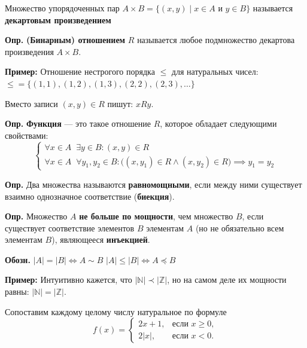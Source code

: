 \documentclass[10pt, a4paper]{article}
\begin{document}
\noindent Множество упорядоченных пар $A \times B = \{ (x, y) \mid x \in A \text{ и } y \in B \}$ называется \textbf{декартовым произведением}

\vspace{0.4cm}

\noindent \textbf{Опр.}
\textbf{(Бинарным) отношением} $R$ называется любое подмножество декартова произведения $A \times B$.

\vspace{0.2cm}
\noindent \textbf{Пример:}
Отношение нестрогого порядка $\le$ для натуральных чисел: \\
${\le} = \{ (1, 1), (1, 2), (1, 3), (2, 2), (2, 3), \dots \}$ 

\vspace{0.2cm}
\noindent Вместо записи $(x, y) \in R$ пишут: $xRy$.

\vspace{0.4cm}
\noindent \textbf{Опр.}
\textbf{Функция} --- это такое отношение $R$, которое обладает следующими свойствами:
\[ \begin{cases} 
    \forall x \in A \;\; \exists y \in B : (x, y) \in R \\ 
    \forall x \in A \;\; \forall y_1, y_2 \in B : \big( (x, y_1) \in R \land (x, y_2) \in R \big) \implies y_1 = y_2 
\end{cases} \]

\vspace{0.4cm}

\noindent \textbf{Опр.}
Два множества называются \textbf{равномощными}, если между ними существует взаимно однозначное соответствие (\textbf{биекция}).

\vspace{0.4cm}

\noindent \textbf{Опр.}
Множество $A$ \textbf{не больше по мощности}, чем множество $B$, если существует соответствие элементов $B$ элементам $A$ (но не обязательно всем элементам $B$), являющееся \textbf{инъекцией}.

\vspace{0.2cm}
\noindent \textbf{Обозн.} $|A| = |B| \iff A \sim B$ \quad $|A| \le |B| \iff A \preceq B$

\vspace{0.4cm}

\noindent \textbf{Пример:} Интуитивно кажется, что $|\mathbb{N}| \prec |\mathbb{Z}|$, но на самом деле их мощности равны: $|\mathbb{N}| = |\mathbb{Z}|$.

Сопоставим каждому целому числу натуральное по формуле 
\begin{equation*}
    f(x) = \begin{cases} 
2x+1, & \text{если } x \ge 0, \\ 
2|x|, & \text{если } x < 0. 
\end{cases}
\end{equation*}
\end{document}
